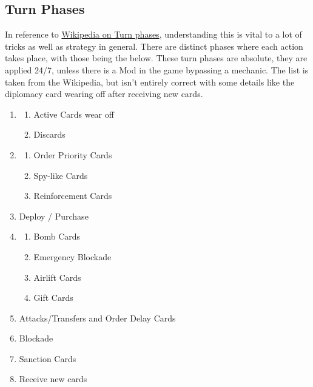 \subsection{Turn Phases}

In reference to \href{https://www.warzone.com/wiki/Turn_phases}{Wikipedia on Turn phases}, understanding this is vital to a lot of tricks as well as strategy in general. There are distinct phases where each action takes place, with those being the below. These turn phases are absolute, they are applied 24/7, unless there is a Mod in the game bypassing a mechanic. The list is taken from the Wikipedia, but isn't entirely correct with some details like the diplomacy card wearing off after receiving new cards.

\begin{enumerate}
    \item 
    \begin{enumerate}
        \item Active Cards wear off
        \item Discards
    \end{enumerate}
    \item 
    \begin{enumerate}
        \item Order Priority Cards
        \item Spy-like Cards
        \item Reinforcement Cards
    \end{enumerate}
    \item Deploy / Purchase
    \item 
    \begin{enumerate}
        \item Bomb Cards
        \item Emergency Blockade
        \item Airlift Cards
        \item Gift Cards
    \end{enumerate}
    \item Attacks/Transfers and Order Delay Cards
    \item Blockade
    \item Sanction Cards
    \item Receive new cards
\end{enumerate}

